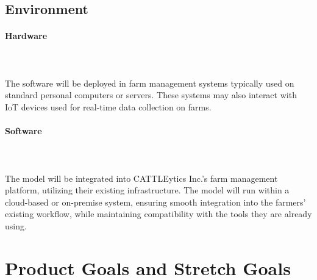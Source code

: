 \documentclass{article}
\begin{document}
\subsection{Environment}

\paragraph{Hardware} \ \\
\\
The software will be deployed in farm management systems typically used on standard personal computers or servers. These systems may also interact with IoT devices used for real-time data collection on farms.
\paragraph{Software} \ \\
\\
The model will be integrated into CATTLEytics Inc.'s farm management platform, utilizing their existing infrastructure. The model will run within a cloud-based or on-premise system, ensuring smooth integration into the farmers' existing workflow, while maintaining compatibility with the tools they are already using.

\section{Product Goals and Stretch Goals}
\end{document}
